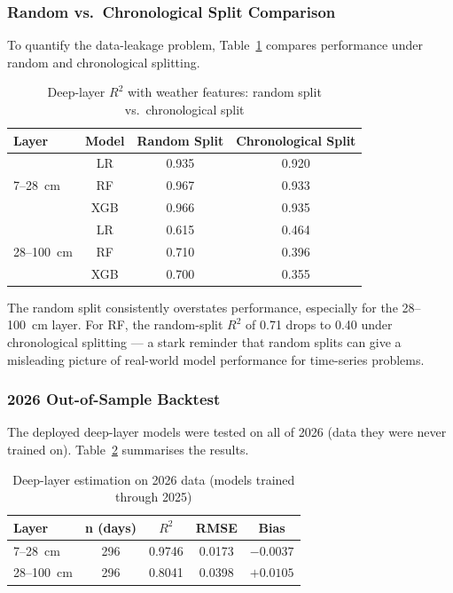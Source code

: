\documentclass[12pt, a4paper]{article}
\begin{document}
\subsubsection{Random vs.\ Chronological Split Comparison}

To quantify the data-leakage problem, Table~\ref{tab:split} compares performance under random and chronological splitting.

\begin{table}[H]
\centering
\caption{Deep-layer $R^2$ with weather features: random split vs.\ chronological split}
\label{tab:split}
\begin{tabular}{lccc}
\toprule
\textbf{Layer} & \textbf{Model} & \textbf{Random Split} & \textbf{Chronological Split} \\
\midrule
\multirow{3}{*}{7--28~cm} & LR  & 0.935 & 0.920 \\
                          & RF  & 0.967 & 0.933 \\
                          & XGB & 0.966 & 0.935 \\
\midrule
\multirow{3}{*}{28--100~cm} & LR  & 0.615 & 0.464 \\
                            & RF  & 0.710 & 0.396 \\
                            & XGB & 0.700 & 0.355 \\
\bottomrule
\end{tabular}
\end{table}

The random split consistently overstates performance, especially for the 28--100~cm layer. For RF, the random-split $R^2$ of 0.71 drops to 0.40 under chronological splitting --- a stark reminder that random splits can give a misleading picture of real-world model performance for time-series problems.

\subsubsection{2026 Out-of-Sample Backtest}

The deployed deep-layer models were tested on all of 2026 (data they were never trained on). Table~\ref{tab:deep2026} summarises the results.

\begin{table}[H]
\centering
\caption{Deep-layer estimation on 2026 data (models trained through 2025)}
\label{tab:deep2026}
\begin{tabular}{lcccc}
\toprule
\textbf{Layer} & \textbf{n (days)} & \textbf{$R^2$} & \textbf{RMSE} & \textbf{Bias} \\
\midrule
7--28~cm   & 296 & 0.9746 & 0.0173 & $-0.0037$ \\
28--100~cm & 296 & 0.8041 & 0.0398 & $+0.0105$ \\
\bottomrule
\end{tabular}
\end{table}
\end{document}
